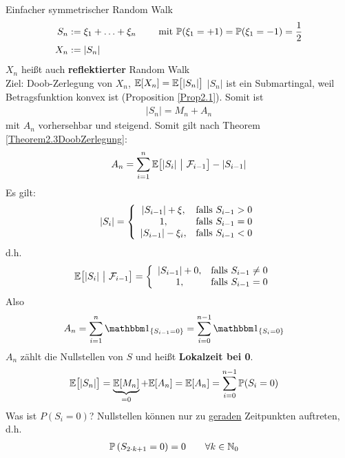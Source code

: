 \begin{beisp}
	Einfacher symmetrischer Random Walk 
	\begin{align*}
		S_n&:=\xi_1+\ldots+\xi_n \qquad\mit\P(\xi_1=+1)=\P(\xi_1=-1)=\frac{1}{2}\\
		X_n&:=|S_n|
	\end{align*}
	$X_n$ heißt auch \textbf{reflektierter} Random Walk\\
	Ziel: Doob-Zerlegung von $X_n$, $\E[X_n]=\E\big[|S_n|\big]$
	$|S_n|$ ist ein Submartingal, weil Betragsfunktion konvex ist (Proposition \ref{Prop2.1}). Somit ist
	\begin{align*}
		|S_n|=M_n+A_n
	\end{align*}
	mit $A_n$ vorhersehbar und steigend. Somit gilt nach Theorem \ref{Theorem2.3DoobZerlegung}:
	\begin{align*}
		A_n=\sum\limits_{i=1}^n \E\big[|S_i|~\big|~\F_{i-1}\big]-|S_{i-1}|
	\end{align*}
	Es gilt:
	\begin{align*}
		|S_i|=\left\lbrace\begin{array}{cl}
			|S_{i-1}|+\xi, & \falls S_{i-1}>0\\
			1, &\falls S_{i-1}=0\\
			|S_{i-1}|-\xi_i, &\falls S_{i-1}<0
		\end{array}\right.
	\end{align*}
	d.h.
	\begin{align*}
		\E\big[|S_i|~\big|~\F_{i-1}\big]&=\left\lbrace\begin{array}{cl}
			|S_{i-1}|+0, &\falls S_{i-1}\neq0\\
			1, &\falls S_{i-1}=0
		\end{array}\right.
	\end{align*}
	Also
	\begin{align*}
		A_n&=\sum\limits_{i=1}^n\indi_{\lbrace S_{i-1}=0\rbrace}=\sum\limits_{i=0}^{n-1}\indi_{\lbrace S_i=0\rbrace}
	\end{align*}
	$A_n$ zählt die Nullstellen von $S$ und heißt \textbf{Lokalzeit bei 0}.
	\begin{align*}
		\E\big[|S_n|\big]&=
		\underbrace{\E[M_n]}_{=0}+\E[A_n]
		=\E[A_n]
		=\sum\limits_{i=0}^{n-1}\P(S_i=0)
	\end{align*}
	Was ist $P(S_i=0)$? Nullstellen können nur zu \ul{geraden} Zeitpunkten auftreten, d.h.
	\begin{align*}
		\P\left(S_{2\cdot k+1}=0\right)&=0\qquad\forall k\in\N_0
	\end{align*}

\end{beisp}
